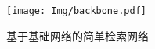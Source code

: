 \begin{figure}[h]
  \centering
  \texttt{[image: Img/backbone.pdf]}
  \caption{基于基础网络的简单检索网络}
  \label{fig:backbone}
\end{figure}
